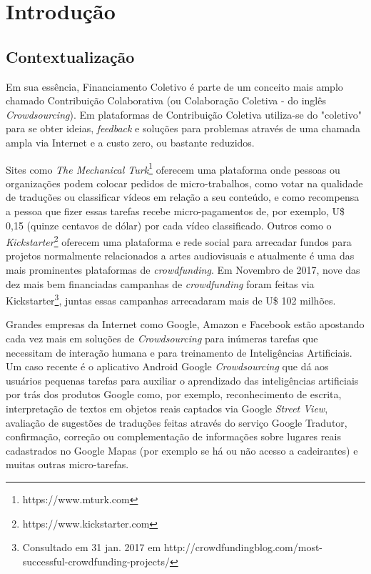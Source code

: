 \chapter{Introdução}

\section{Contextualização}
Em sua essência, Financiamento Coletivo é parte de um conceito mais amplo chamado Contribuição Colaborativa (ou Colaboração Coletiva - do inglês \emph{Crowdsourcing}). Em plataformas de Contribuição Coletiva utiliza-se do "coletivo" para se obter ideias, \emph{feedback} e soluções para problemas através de uma chamada ampla via Internet e a custo zero, ou bastante reduzidos.

Sites como \emph{The Mechanical Turk}\footnote{https://www.mturk.com} oferecem uma plataforma onde pessoas ou organizações podem colocar pedidos de micro-trabalhos, como votar na qualidade de traduções ou classificar vídeos em relação a seu conteúdo, e como recompensa a pessoa que fizer essas tarefas recebe micro-pagamentos de, por exemplo, U\$ 0,15 (quinze centavos de dólar) por cada vídeo classificado. Outros como o \emph{Kickstarter}\footnote{https://www.kickstarter.com} oferecem uma plataforma e rede social para arrecadar fundos para projetos normalmente relacionados a artes audiovisuais e atualmente é uma das mais prominentes plataformas de \emph{crowdfunding}. Em Novembro de 2017, nove das dez mais bem financiadas campanhas de \emph{crowdfunding} foram feitas via Kickstarter\footnote{Consultado em 31 jan. 2017 em http://crowdfundingblog.com/most-successful-crowdfunding-projects/}, juntas essas campanhas arrecadaram mais de U\$ 102 milhões.

Grandes empresas da Internet como Google, Amazon e Facebook estão apostando cada vez mais em soluções de \emph{Crowdsourcing} para inúmeras tarefas que necessitam de interação humana e para treinamento de Inteligências Artificiais. Um caso recente é o aplicativo Android Google \emph{Crowdsourcing} \cite{cnet-google-crowdsourcing} que dá aos usuários pequenas tarefas para auxiliar o aprendizado das inteligências artificiais por trás dos produtos Google como, por exemplo, reconhecimento de escrita, interpretação de textos em objetos reais captados via Google \emph{Street View}, avaliação de sugestões de traduções feitas através do serviço Google Tradutor, confirmação, correção ou complementação de informações sobre lugares reais cadastrados no Google Mapas (por exemplo se há ou não acesso a cadeirantes) e muitas outras micro-tarefas.

